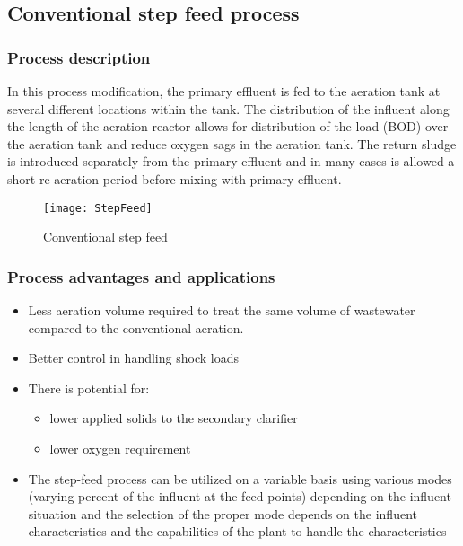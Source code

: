 		\subsection{Conventional step feed process}



\subsubsection{Process description}
\noindent In this process modification, the primary effluent is fed to the aeration tank at several different locations within the tank.  The distribution of the influent along the length of the aeration reactor allows for distribution of the load (BOD) over the aeration tank and reduce oxygen sags in the aeration tank.  The return sludge is introduced separately from the primary effluent and in many cases is allowed a short re-aeration period  before mixing with primary effluent.\\

\begin{figure}[bth!]
\begin{center}
\texttt{[image: StepFeed]}\\
\caption{Conventional step feed}
\end{center}
\end{figure}

\subsubsection{Process advantages and applications}
\begin{itemize}
\item Less aeration volume required to treat the same volume of wastewater compared to the conventional aeration.

\item Better control in handling shock loads

\item There is potential for:
\begin{itemize}
\item lower applied solids to the secondary clarifier
\item lower oxygen requirement
\end{itemize}
\item The step-feed process can be utilized on a variable basis using various modes (varying percent of the influent at the feed points) depending on the influent situation and the selection of the proper mode depends on the influent characteristics and the capabilities of the plant to handle the characteristics

\end{itemize}


